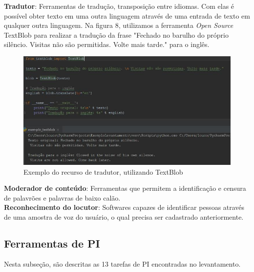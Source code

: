 \documentclass{article}
\begin{document}
\textbf{Tradutor}: Ferramentas de tradução, transposição entre idiomas. Com elas é possível obter texto em uma outra linguagem através de uma entrada de texto em qualquer outra linguagem. Na figura 8, utilizamos a ferramenta \textit{Open Source} TextBlob para realizar a tradução da frase "Fechado no barulho do próprio silêncio. Visitas não são permitidas. Volte mais tarde." para o inglês. \\
    \begin{figure}[H]
        \centering
        \includegraphics[scale=0.45]{imagens/tradutor.jpg}
        \caption{Exemplo do recurso de tradutor, utilizando TextBlob}
        \label{fig:tradutor}
    \end{figure}
\textbf{Moderador de conteúdo}: Ferramentas que permitem a identificação e censura de palavrões e palavras de baixo calão. \\
\textbf{Reconhecimento do locutor}: Softwares capazes de identificar pessoas através de uma amostra de voz do usuário, o qual precisa ser cadastrado anteriormente. \\

\subsection{Ferramentas de PI}
Nesta subseção, são descritas as 13 tarefas de PI encontradas no levantamento. \\
\end{document}
